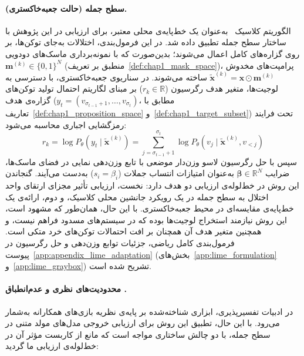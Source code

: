 \paragraph{ سطح جمله (حالت جعبه‌خاکستری).}\label{par:chap5_lime_graybox_baseline}
الگوریتم  کلاسیک~\cite{ribeiro2016lime} به‌عنوان یک خط‌پایه‌ی محلی معتبر، برای ارزیابی در این پژوهش با ساختار سطح جمله تطبیق داده شد. در این فرمول‌بندی، اختلالات به‌جای توکن‌ها، بر روی گزاره‌های کامل اعمال می‌شوند؛ بدین‌صورت که با نمونه‌برداری ماسک‌های دودویی $\mathbf{m}^{(k)} \in {\{0, 1\}}^N$ (منطبق بر تعریف~\ref{def:chap1_mask_space})، پرامپت‌های مخدوش $\tilde{\mathbf{x}}^{(k)} = \mathbf{x} \odot \mathbf{m}^{(k)}$ ساخته می‌شوند. 
در سناریوی جعبه‌خاکستری، با دسترسی به لوجیت‌ها، متغیر هدف رگرسیون ($r_k \in \mathbb{R}$) بر مبنای لگاریتم احتمال تولید توکن‌های گزاره‌ی هدف ($y_t = (v_{\sigma_{t-1}+1}, \dots, v_{\sigma_t})$، مطابق با تعاریف~\ref{def:chap1_proposition_space} و~\ref{def:chap1_target_subset}) تحت فرایند رمزگشایی اجباری محاسبه می‌شود:
\begin{equation}\label{eq:chap5_lime_graybox_target_main}
    r_k = \log P_\theta\left(y_t \mid \tilde{\mathbf{x}}^{(k)}\right) = \sum_{j=\sigma_{t-1}+1}^{\sigma_t} \log P_\theta\left(v_j \mid \tilde{\mathbf{x}}^{(k)}, v_{<j}\right)
\end{equation}
سپس با حل رگرسیون لاسو وزن‌دار موضعی با تابع وزن‌دهی نمایی در فضای ماسک‌ها، ضرایب $\boldsymbol{\beta} \in \mathbb{R}^N$ به‌عنوان امتیازات انتساب جملات ($s_i = \beta_i$) به‌دست می‌آیند. 
گنجاندن این روش در خط‌لوله‌ی ارزیابی دو هدف دارد: نخست، ارزیابی تأثیر مجزای ارتقای واحد اختلال به سطح جمله در یک رویکرد جانشین محلی کلاسیک، و دوم، ارائه‌ی یک خط‌پایه‌ی مقایسه‌ای در محیط جعبه‌خاکستری. با این حال، همان‌طور که مشهود است، این روش نیازمند استخراج لوجیت‌ها بوده که در سیستم‌های مسدود فراهم نیست، و همچنین متغیر هدف آن همچنان بر افت احتمالات توکن‌های خرد متکی است. فرمول‌بندی کامل ریاضی، جزئیات توابع وزن‌دهی و حل رگرسیون در پیوست~\ref{app:appendix_lime_adaptation} (بخش‌های~\ref{app:lime_formulation} و~\ref{app:lime_graybox}) تشریح شده است.

\paragraph{محدودیت‌های نظری و عدم‌انطباق .}\label{par:chap5_reject_shap}
در ادبیات تفسیرپذیری،  ابزاری شناخته‌شده بر پایه‌ی نظریه بازی‌های همکارانه به‌شمار می‌رود. با این حال، تطبیق این روش برای ارزیابی خروجی مدل‌های مولد متنی در سطح جمله، با دو چالش ساختاری مواجه است که مانع از کاربست مؤثر آن در خط‌لوله‌ی ارزیابی ما گردید:

